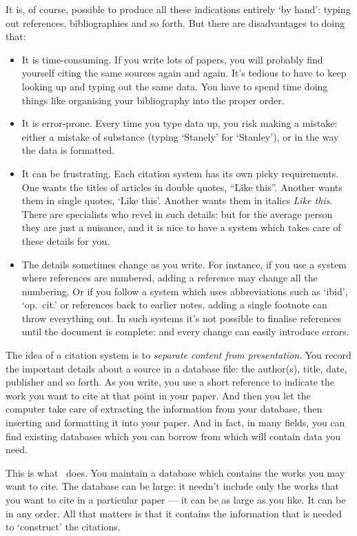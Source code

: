 It is, of course, possible to produce all these indications entirely
`by hand': typing out references, bibliographies and so forth. But
there are disadvantages to doing that:
\begin{itemize}
\item It is time-consuming. If you write lots of papers, you will
  probably find yourself citing the same sources again and again. It's
  tedious to have to keep looking up and typing out the same data. You
  have to spend time doing things like organising your bibliography
  into the proper order.
\item It is error-prone. Every time you type data up, you risk making
  a mistake: either a mistake of substance (typing `Stanely' for
  `Stanley'), or in the way the data is formatted.
\item It can be frustrating. Each citation system has its own picky
  requirements. One wants the titles of articles in double quotes,
  ``Like this''. Another wants them in single quotes, `Like
  this'. Another wants them in italics \emph{Like this}. There are
  specialists who revel in such details: but for the average person
  they are just a nuisance, and it is nice to have a system which
  takes care of these details for you.
\item The details sometimes change as you write. For instance, if you
  use a system where references are numbered, adding a reference may
  change all the numbering. Or if you follow a system which uses
  abbreviations such as `ibid', `op.\ cit.' or references back to
  earlier notes, adding a single footnote can throw everything out. In
  such systems it's not possible to finalise references until the
  document is complete: and every change can easily introduce errors.
\end{itemize}

The idea of a citation system is to \emph{separate content from
  presentation}. You record the important details about a source in a
database file: the author(s), title, date, publisher and so forth. As
you write, you use a short reference to indicate the work you want to
cite at that point in your paper. And then you let the computer take
care of extracting the information from your database, then inserting
and formatting it into your paper. And in fact, in many fields, you
can find existing databases which you can borrow from which will
contain data you need.

This is what \biblatex\ does. You maintain a database which contains
the works you may want to cite. The database can be large: it needn't
include only the works that you want to cite in a particular paper ---
it can be as large as you like. It can be in any order. All that
matters is that it contains the information that is needed to
`construct' the citations.

